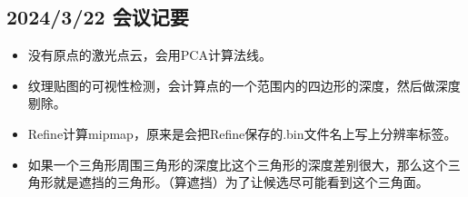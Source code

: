 \subsection{2024/3/22 会议记要}

\begin{itemize}
    \item 没有原点的激光点云，会用PCA计算法线。
    \item 纹理贴图的可视性检测，会计算点的一个范围内的四边形的深度，然后做深度剔除。
    \item Refine计算mipmap，原来是会把Refine保存的.bin文件名上写上分辨率标签。
    \item 如果一个三角形周围三角形的深度比这个三角形的深度差别很大，那么这个三角形就是遮挡的三角形。（算遮挡）为了让候选尽可能看到这个三角面。
\end{itemize}